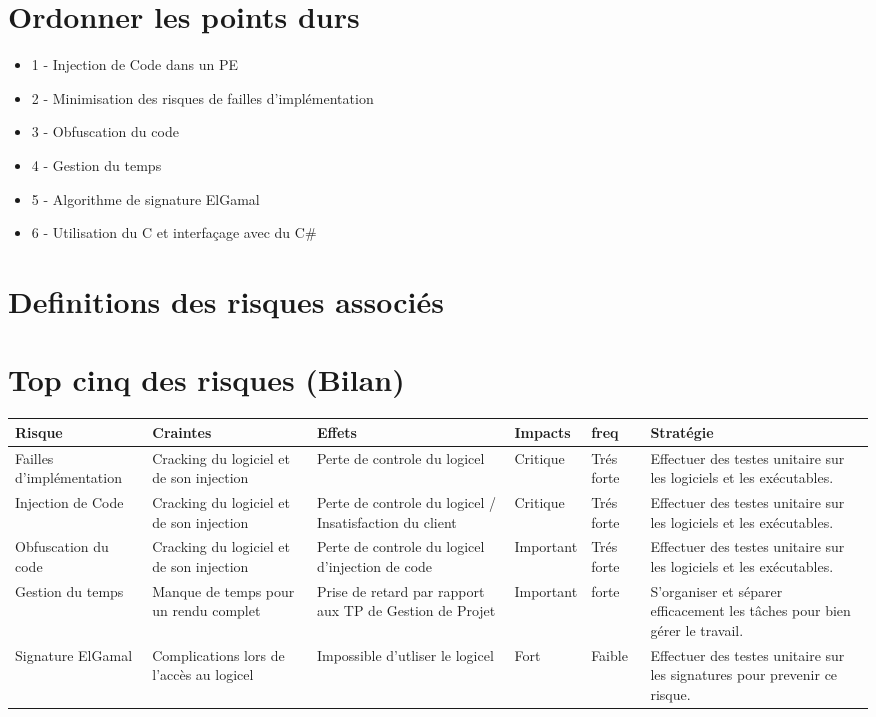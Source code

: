 \chapter{Ordonner les points durs}
\begin{itemize}
	\item 1 - Injection de Code dans un PE
	\item 2 - Minimisation des risques de failles d'implémentation
	\item 3 - Obfuscation du code
	\item 4 - Gestion du temps
	\item 5 - Algorithme de signature ElGamal
	\item 6 - Utilisation du C et interfaçage avec du C\# 
\end{itemize}

\chapter{Definitions des risques associés}

\chapter{Top cinq des risques (Bilan)}

\begin{table}[!h]
    \small
    \begin{tabular}{|m{2.5cm}|m{2.5cm}|m{2.5cm}|m{1.5cm}|m{1.5cm}|m{4cm}|} 
	\hline
	\textbf{Risque} & \textbf{Craintes} & \textbf{Effets} & \textbf{Impacts} & \textbf{freq} & \textbf{Stratégie}\\
	\hline
	Failles d'implémentation & Cracking du logiciel et de son injection &  Perte de controle du logicel & Critique & Trés forte & Effectuer des testes unitaire sur les logiciels et les exécutables.\\
	\hline
	Injection de Code & Cracking du logiciel et de son injection &  Perte de controle du logicel / Insatisfaction du client & Critique & Trés forte & Effectuer des testes unitaire sur les logiciels et les exécutables.\\
	\hline
	Obfuscation du code & Cracking du logiciel et de son injection &  Perte de controle du logicel d'injection de code & Important & Trés forte & Effectuer des testes unitaire sur les logiciels et les exécutables.\\
	\hline
	Gestion du temps & Manque de temps pour un rendu complet &  Prise de retard par rapport aux TP de Gestion de Projet & Important & forte & S’organiser et séparer efficacement les tâches pour bien gérer le travail.\\
	\hline
	Signature ElGamal & Complications lors de l'accès au logicel &  Impossible d'utliser le logicel & Fort & Faible & Effectuer des testes unitaire sur les signatures pour prevenir ce risque.\\
	\hline	    
    \end{tabular}
\end{table}

